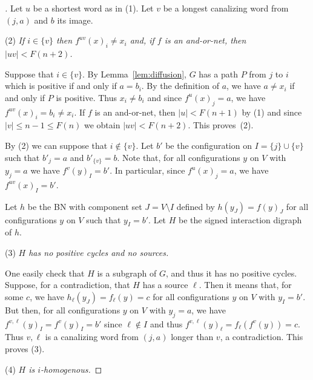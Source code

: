 \documentclass[11pt,letter]{article}
\newcommand{\BF}[1]{{{\boldmath{\bf #1}\unboldmath}}}
\begin{document}
\begin{proof}[\BF{Proof of Lemmas~\ref{lem:no_fixed_vertex} and \ref{lem:no_fixed_vertex_2}}]
\bigskip
Let $u$ be a shortest word as in (1). Let $v$ be a longest canalizing word from $(j,a)$ and $b$ its image. 

\bigskip
\noindent
(2) {\em If $i\in\{v\}$ then $f^{uv}(x)_i\neq x_i$ and, if $f$ is an and-or-net, then $|uv|< F(n+2)$.}

\medskip
\noindent
Suppose that $i\in\{v\}$. By Lemma~\ref{lem:diffusion}, $G$ has a path $P$ from $j$ to $i$ which is positive if and only if $a=b_i$. By the definition of $a$, we have $a\neq x_i$ if and only if $P$ is positive. Thus $x_i\neq b_i$  and since $f^u(x)_j=a$, we have $f^{uv}(x)_i=b_i\neq x_i$. If $f$ is an and-or-net, then $|u|< F(n+1)$ by (1) and since $|v|\leq n-1\leq F(n)$ we obtain $|uv|< F(n+2)$. This proves~(2). 

\bigskip
By (2) we can suppose that $i\not\in\{v\}$. Let $b'$ be the configuration on $I=\{j\}\cup\{v\}$ such that $b'_j=a$ and ${b'}_{\{v\}}=b$. Note that, for all configurations $y$ on $V$ with $y_j=a$ we have $f^v(y)_I=b'$. In particular, since $f^u(x)_j=a$, we have $f^{uv}(x)_I=b'$. 

\medskip
Let $h$ be the BN with component set $J=V\setminus I$ defined by $h(y_J)=f(y)_J$ for all configurations $y$ on $V$ such that $y_I=b'$. Let $H$ be the signed interaction digraph of $h$.

\bigskip
\noindent
(3) {\em $H$ has no positive cycles and no sources.}

\medskip
\noindent
One easily check that $H$ is a subgraph of $G$, and thus it has no positive cycles. Suppose, for a contradiction, that $H$ has a source $\ell$. Then it means that, for some $c$, we have $h_\ell(y_J)=f_\ell(y)=c$ for all configurations $y$ on $V$ with $y_I=b'$. But then, for all configurations $y$ on $V$ with $y_j=a$, we have $f^{v,\ell}(y)_I=f^v(y)_I=b'$ since $\ell\not\in I$ and thus $f^{v,\ell}(y)_\ell=f_\ell(f^v(y))=c$. Thus $v,\ell$ is a canalizing word from $(j,a)$ longer than $v$, a contradiction. This proves (3). 

\bigskip
\noindent
(4) {\em $H$ is $i$-homogenous.}


\end{proof}
\end{document}
